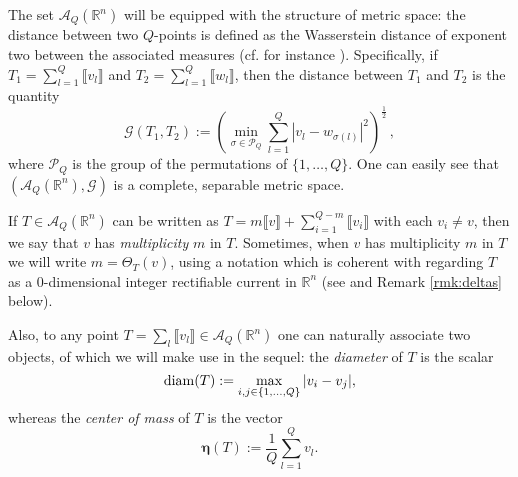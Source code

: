 \documentclass[a4paper,11pt,reqno]{amsart}
\theoremstyle{definition}
\numberwithin{equation}{section}
\numberwithin{subsection}{section}
\newcommand{\R}{\mathbb{R}}
\newcommand{\A}{\mathcal{A}}
\newcommand{\G}{\mathcal{G}}
\newcommand{\bfeta}{\boldsymbol{\eta}}
\begin{document}

The set $\A_{Q}(\R^n)$ will be equipped with the structure of metric space: the distance between two $Q$-points is defined as the Wasserstein distance of exponent two between the associated measures (cf. for instance \cite[Section 7.1]{Vil03}). Specifically, if $T_{1} = \sum_{l=1}^{Q} \llbracket v_{l} \rrbracket$ and $T_{2} = \sum_{l=1}^{Q} \llbracket w_{l} \rrbracket$, then the distance between $T_{1}$ and $T_{2}$ is the quantity
\[
\G(T_{1}, T_{2}) := \left( \min_{\sigma \in \mathcal{P}_{Q}} \sum_{l=1}^{Q} |v_{l} - w_{\sigma(l)}|^{2} \right)^{\frac{1}{2}}\,,
\]
where $\mathcal{P}_{Q}$ is the group of the permutations of $\{1,\dots,Q\}$. One can easily see that $\left( \A_{Q}(\R^n), \G \right)$ is a complete, separable metric space.

If $T \in \A_{Q}(\R^{n})$ can be written as $T = m \llbracket v \rrbracket + \sum_{i=1}^{Q-m} \llbracket v_{i} \rrbracket$ with each $v_{i} \neq v$, then we say that $v$ has \emph{multiplicity} $m$ in $T$. Sometimes, when $v$ has multiplicity $m$ in $T$ we will write $m = \Theta_{T}(v)$, using a notation which is coherent with regarding $T$ as a $0$-dimensional integer rectifiable current in $\R^{n}$ (see \cite[Section 27]{Sim83} and Remark \ref{rmk:deltas} below).

Also, to any point $T = \sum_{l} \llbracket v_{l} \rrbracket \in \A_{Q}(\R^{n})$ one can naturally associate two objects, of which we will make use in the sequel: the \emph{diameter} of $T$ is the scalar
\[
{\rm diam}(T) := \max_{i,j \in \{1,\dots,Q\}} |v_{i} - v_{j}|,
\]
whereas the \emph{center of mass} of $T$ is the vector
\[
\bfeta(T) := \frac{1}{Q} \sum_{l=1}^{Q} v_{l}.
\]
\end{document}
